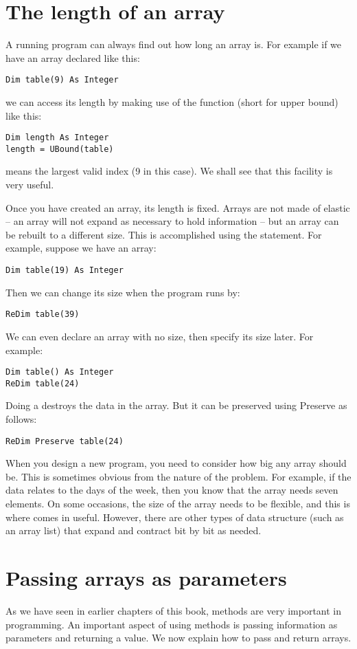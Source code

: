 	\section{The length of an array}
		A running program can always find out how long an array is. For example if we have an array declared like this:
		\begin{lstlisting}
Dim table(9) As Integer
		\end{lstlisting}
		we can access its length by making use of the function  (short for upper bound) like this:
		\begin{lstlisting}
Dim length As Integer
length = UBound(table)
		\end{lstlisting}
		 means the largest valid index (9 in this case). We shall see that this facility is very useful.

		Once you have created an array, its length is fixed. Arrays are not made of elastic – an array will not expand as necessary to hold information – but an array can be rebuilt to a different size. This is accomplished using the  statement. For example, suppose we have an array:
		\begin{lstlisting}
Dim table(19) As Integer
		\end{lstlisting}
		Then we can change its size when the program runs by:
		\begin{lstlisting}
ReDim table(39)
		\end{lstlisting}
		We can even declare an array with no size, then specify its size later. For example:
		\begin{lstlisting}
Dim table() As Integer
ReDim table(24)
		\end{lstlisting}
		Doing a  destroys the data in the array. But it can be preserved using Preserve as follows:

		\begin{lstlisting}
ReDim Preserve table(24)
		\end{lstlisting}
		When you design a new program, you need to consider how big any array should be. This is sometimes obvious from the nature of the problem. For example, if the data relates to the days of the week, then you know that the array needs seven elements. On some occasions, the size of the array needs to be flexible, and this is where  comes in useful. However, there are other types of data structure (such as an array list) that expand and contract bit by bit as needed.


	\section{Passing arrays as parameters}
		As we have seen in earlier chapters of this book, methods are very important in programming. An important aspect of using methods is passing information as parameters and returning a value. We now explain how to pass and return arrays.
		

